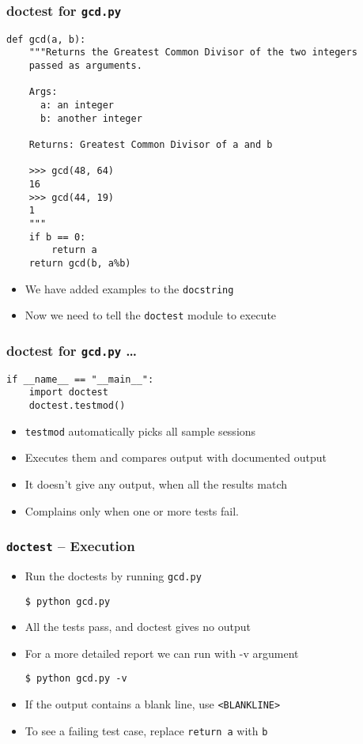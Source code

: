 \documentclass[12pt,presentation]{beamer}
\begin{document}
\begin{frame}[fragile]
  \frametitle{doctest for \texttt{gcd.py}}
\begin{tiny}
\begin{lstlisting}
def gcd(a, b):
    """Returns the Greatest Common Divisor of the two integers
    passed as arguments.

    Args:
      a: an integer
      b: another integer

    Returns: Greatest Common Divisor of a and b

    >>> gcd(48, 64)
    16
    >>> gcd(44, 19)
    1
    """
    if b == 0:
        return a
    return gcd(b, a%b) 
\end{lstlisting}
\end{tiny}
\begin{itemize}
\item We have added examples to the \texttt{docstring}
\item Now we need to tell the \texttt{doctest} module to execute
\end{itemize}
\end{frame}

\begin{frame}[fragile]
  \frametitle{doctest for \texttt{gcd.py} \ldots}
\begin{lstlisting}
if __name__ == "__main__":
    import doctest
    doctest.testmod()
\end{lstlisting}
\begin{itemize}
\item \texttt{testmod} automatically picks all sample sessions
\item Executes them and compares output with documented output
\item It doesn't give any output, when all the results match 
\item Complains only when one or more tests fail. 
\end{itemize}
\end{frame}

\begin{frame}[fragile]
  \frametitle{\texttt{doctest} -- Execution}
  \begin{itemize}
  \item Run the doctests by running \texttt{gcd.py}
\begin{lstlisting}
$ python gcd.py
\end{lstlisting} %
  \item All the tests pass, and doctest gives no output
  \item For a more detailed report we can run with -v argument
\begin{lstlisting}
$ python gcd.py -v
\end{lstlisting} %
  \item If the output contains a blank line, use \texttt{<BLANKLINE>}
  \item To see a failing test case, replace \texttt{return a} with \texttt{b}
  \end{itemize}
\end{frame}
\end{document}
